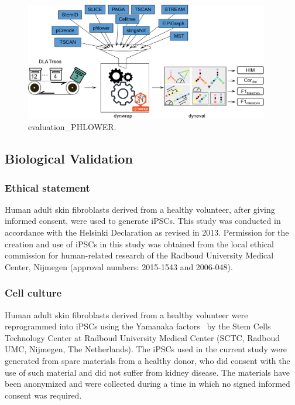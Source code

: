 \begin{figure}[!ht]
	\centering
	\includegraphics[width=0.95\textwidth]{evaluation_PHLOWER/fig}
	\vspace{0.1cm}
	\caption[evaluation\_PHLOWER]{
	evaluation\_PHLOWER.}
	\label{fig:evaluation_PHLOWER}
\end{figure}




\subsection{Biological Validation}


\subsubsection{Ethical statement}

Human adult skin fibroblasts derived from a healthy volunteer, after giving informed consent, were used to generate iPSCs. This study was conducted in accordance with the Helsinki Declaration as revised in 2013. Permission for the creation and use of iPSCs in this study was obtained from the local ethical commission for human-related research of the Radboud University Medical Center, Nijmegen (approval numbers: 2015-1543 and 2006-048). 

\subsubsection{Cell culture}

Human adult skin fibroblasts derived from a healthy volunteer were reprogrammed into iPSCs using the Yamanaka factors~\citep{takahashi2006induction} by the Stem Cells Technology Center at Radboud University Medical Center (SCTC, Radboud UMC, Nijmegen, The Netherlands). The iPSCs used in the current study were generated from spare materials from a healthy donor, who did consent with the use of such material and did not suffer from kidney disease. The materials have been anonymized and were collected during a time in which no signed informed consent was required.

